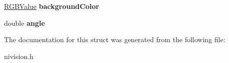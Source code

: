 \begin{DoxyCompactItemize}
\item 
\hypertarget{structOverlayTextOptions__struct_a0b34d0d5d547d7404b724128d5744e48}{\hyperlink{structRGBValue__struct}{\-R\-G\-B\-Value} {\bfseries background\-Color}}\label{structOverlayTextOptions__struct_a0b34d0d5d547d7404b724128d5744e48}

\item 
\hypertarget{structOverlayTextOptions__struct_a16867b5bef31e3323f890997917ec193}{double {\bfseries angle}}\label{structOverlayTextOptions__struct_a16867b5bef31e3323f890997917ec193}

\end{DoxyCompactItemize}


\-The documentation for this struct was generated from the following file\-:\begin{DoxyCompactItemize}
\item 
nivision.\-h\end{DoxyCompactItemize}
